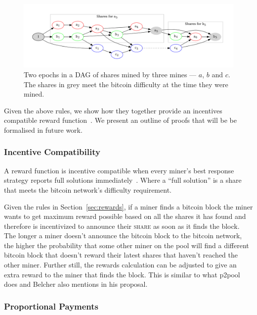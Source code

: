 \documentclass{article}
\begin{document}
\begin{figure}
  \begin{center}
    \includegraphics[width=1.0\textwidth]{shares-dag}
    \caption{Two epochs in a DAG of shares mined by three mines ---
      $a$, $b$ and $c$. The shares in grey meet the bitcoin difficulty
      at the time they were mined.}\label{fig:shares-dag}
  \end{center}
\end{figure}

Given the above rules, we show how they together provide an incentives
compatible reward function~\cite{incentives-compatible}. We present an
outline of proofs that will be be formalised in future work.

\subsubsection{Incentive Compatibility}\label{sec:incentive-compatability}

A reward function is incentive compatible when every miner's best
response strategy reports full solutions
immediately~\cite{incentives-compatible}. Where a ``full solution'' is
a share that meets the bitcoin network's difficulty requirement.

Given the rules in Section~\ref{sec:rewards}, if a miner finds a
bitcoin block the miner wants to get maximum reward possible based on
all the shares it has found and therefore is incentivized to announce
their \textsc{share} as soon as it finds the block. The longer a miner
doesn't announce the bitcoin block to the bitcoin network, the higher
the probability that some other miner on the pool will find a
different bitcoin block that doesn't reward their latest shares that
haven't reached the other miner. Further still, the rewards
calculation can be adjusted to give an extra reward to the miner that
finds the block. This is similar to what p2pool does and Belcher also
mentions in his proposal.

\subsubsection{Proportional Payments}\label{sec:proportional-payments}
\end{document}
